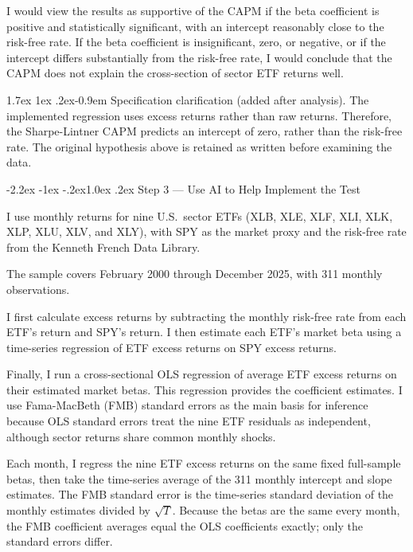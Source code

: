 \documentclass[11pt]{article}
\makeatletter
\renewcommand\subsection{\@startsection{subsection}{2}{0pt}%
  {-2.2ex \@plus -1ex \@minus -.2ex}{1.0ex \@plus .2ex}%
  {\normalfont\bfseries\normalsize\color{psink}}}
\renewcommand\paragraph{\@startsection{paragraph}{4}{0pt}%
  {1.7ex \@plus 1ex \@minus .2ex}{-0.9em}%
  {\normalfont\bfseries\normalsize\color{psink}}}
\makeatother
\begin{document}
I would view the results as supportive of the CAPM if the beta coefficient is
positive and statistically significant, with an intercept reasonably close to
the risk-free rate. If the beta coefficient is insignificant, zero, or
negative, or if the intercept differs substantially from the risk-free rate, I
would conclude that the CAPM does not explain the cross-section of sector ETF
returns well.

\paragraph{Specification clarification (added after analysis).} The implemented
regression uses excess returns rather than raw returns. Therefore, the
Sharpe-Lintner CAPM predicts an intercept of zero, rather than the risk-free
rate. The original hypothesis above is retained as written before examining the
data.

\subsection{Step 3 --- Use AI to Help Implement the Test}

I use monthly returns for nine U.S.\ sector ETFs (XLB, XLE, XLF, XLI, XLK, XLP,
XLU, XLV, and XLY), with SPY as the market proxy and the risk-free rate from
the Kenneth French Data Library.

The sample covers February 2000 through December 2025, with 311 monthly
observations.

I first calculate excess returns by subtracting the monthly risk-free rate from
each ETF's return and SPY's return. I then estimate each ETF's market beta
using a time-series regression of ETF excess returns on SPY excess returns.

Finally, I run a cross-sectional OLS regression of average ETF excess returns
on their estimated market betas. This regression provides the coefficient
estimates. I use Fama-MacBeth (FMB) standard errors as the main basis for
inference because OLS standard errors treat the nine ETF residuals as
independent, although sector returns share common monthly shocks.

Each month, I regress the nine ETF excess returns on the same fixed full-sample
betas, then take the time-series average of the 311 monthly intercept and slope
estimates. The FMB standard error is the time-series standard deviation of the
monthly estimates divided by $\sqrt{T}$. Because the betas are the same every
month, the FMB coefficient averages equal the OLS coefficients exactly; only
the standard errors differ.
\end{document}
